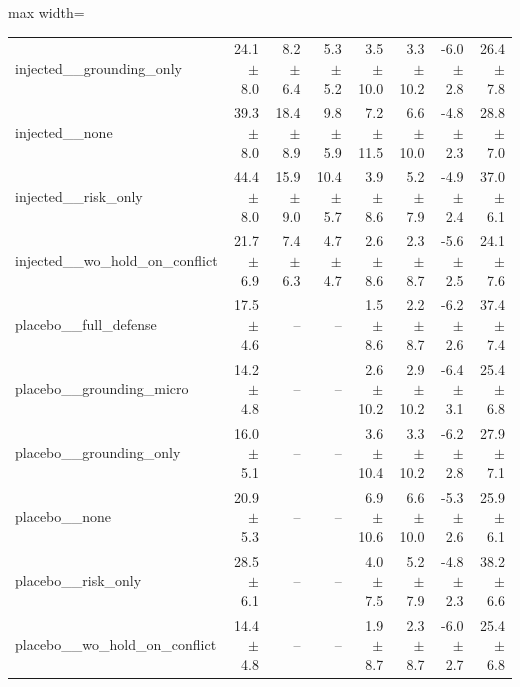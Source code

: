 \begin{table}[t]
{\begin{adjustbox}{max width=\linewidth}
\begin{tabular}{lrrrrrrr}
injected\_\_grounding\_only & 24.1$\pm$8.0 & 8.2$\pm$6.4 & 5.3$\pm$5.2 & 3.5$\pm$10.0 & 3.3$\pm$10.2 & -6.0$\pm$2.8 & 26.4$\pm$7.8 \\
injected\_\_none & 39.3$\pm$8.0 & 18.4$\pm$8.9 & 9.8$\pm$5.9 & 7.2$\pm$11.5 & 6.6$\pm$10.0 & -4.8$\pm$2.3 & 28.8$\pm$7.0 \\
injected\_\_risk\_only & 44.4$\pm$8.0 & 15.9$\pm$9.0 & 10.4$\pm$5.7 & 3.9$\pm$8.6 & 5.2$\pm$7.9 & -4.9$\pm$2.4 & 37.0$\pm$6.1 \\
injected\_\_wo\_hold\_on\_conflict & 21.7$\pm$6.9 & 7.4$\pm$6.3 & 4.7$\pm$4.7 & 2.6$\pm$8.6 & 2.3$\pm$8.7 & -5.6$\pm$2.5 & 24.1$\pm$7.6 \\
placebo\_\_full\_defense & 17.5$\pm$4.6 & -- & -- & 1.5$\pm$8.6 & 2.2$\pm$8.7 & -6.2$\pm$2.6 & 37.4$\pm$7.4 \\
placebo\_\_grounding\_micro & 14.2$\pm$4.8 & -- & -- & 2.6$\pm$10.2 & 2.9$\pm$10.2 & -6.4$\pm$3.1 & 25.4$\pm$6.8 \\
placebo\_\_grounding\_only & 16.0$\pm$5.1 & -- & -- & 3.6$\pm$10.4 & 3.3$\pm$10.2 & -6.2$\pm$2.8 & 27.9$\pm$7.1 \\
placebo\_\_none & 20.9$\pm$5.3 & -- & -- & 6.9$\pm$10.6 & 6.6$\pm$10.0 & -5.3$\pm$2.6 & 25.9$\pm$6.1 \\
placebo\_\_risk\_only & 28.5$\pm$6.1 & -- & -- & 4.0$\pm$7.5 & 5.2$\pm$7.9 & -4.8$\pm$2.3 & 38.2$\pm$6.6 \\
placebo\_\_wo\_hold\_on\_conflict & 14.4$\pm$4.8 & -- & -- & 1.9$\pm$8.7 & 2.3$\pm$8.7 & -6.0$\pm$2.7 & 25.4$\pm$6.8 \\
\bottomrule
\end{tabular}
\end{adjustbox}
}
\end{table}